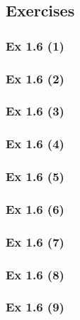 \subsection*{Exercises}\label{sec:1.6_Exercises}

\subsubsection{Ex 1.6 (1)}\label{sec:Ex_1.6.1}

\subsubsection{Ex 1.6 (2)}\label{sec:Ex_1.6.2}

\subsubsection{Ex 1.6 (3)}\label{sec:Ex_1.6.3}

\subsubsection{Ex 1.6 (4)}\label{sec:Ex_1.6.4}

\subsubsection{Ex 1.6 (5)}\label{sec:Ex_1.6.5}

\subsubsection{Ex 1.6 (6)}\label{sec:Ex_1.6.6}

\subsubsection{Ex 1.6 (7)}\label{sec:Ex_1.6.7}

\subsubsection{Ex 1.6 (8)}\label{sec:Ex_1.6.8}

\subsubsection{Ex 1.6 (9)}\label{sec:Ex_1.6.9}

